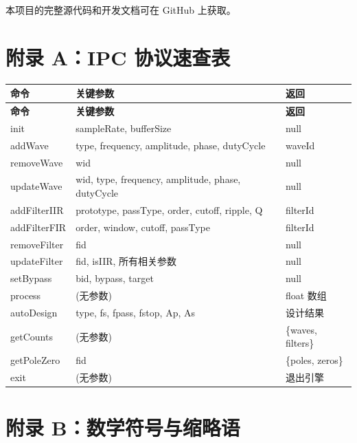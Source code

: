 ﻿\documentclass[12pt,a4paper,oneside]{ctexbook}
\begin{document}
本项目的完整源代码和开发文档可在 GitHub 上获取。

\appendix

\chapter{附录 A：IPC 协议速查表}

\begin{longtable}{p{3cm}p{8cm}p{3cm}}
    \toprule
    \textbf{命令} & \textbf{关键参数} & \textbf{返回} \\
    \midrule
    \endfirsthead
    \toprule
    \textbf{命令} & \textbf{关键参数} & \textbf{返回} \\
    \midrule
    \endhead
    \bottomrule
    \endfoot
    init & sampleRate, bufferSize & null \\
    addWave & type, frequency, amplitude, phase, dutyCycle & waveId \\
    removeWave & wid & null \\
    updateWave & wid, type, frequency, amplitude, phase, dutyCycle & null \\
    addFilterIIR & prototype, passType, order, cutoff, ripple, Q & filterId \\
    addFilterFIR & order, window, cutoff, passType & filterId \\
    removeFilter & fid & null \\
    updateFilter & fid, isIIR, 所有相关参数 & null \\
    setBypass & bid, bypass, target & null \\
    process & (无参数) & float 数组 \\
    autoDesign & type, fs, fpass, fstop, Ap, As & 设计结果 \\
    getCounts & (无参数) & \{waves, filters\} \\
    getPoleZero & fid & \{poles, zeros\} \\
    exit & (无参数) & 退出引擎 \\
    \bottomrule
\end{longtable}

\chapter{附录 B：数学符号与缩略语}
\end{document}
